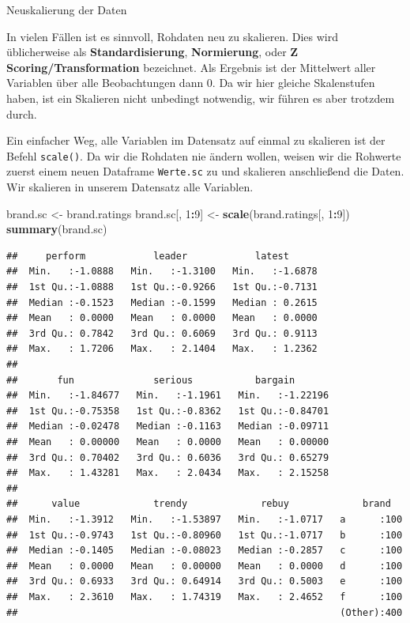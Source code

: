 \documentclass[12pt,ngerman,a4paper,ignorenonframetext,]{beamer}
\newenvironment{Shaded}{\begin{snugshade}}{\end{snugshade}}
\newcommand{\DecValTok}[1]{\textcolor[rgb]{0.00,0.00,0.81}{#1}}
\newcommand{\KeywordTok}[1]{\textcolor[rgb]{0.13,0.29,0.53}{\textbf{#1}}}
\newcommand{\NormalTok}[1]{#1}
\newcommand{\OperatorTok}[1]{\textcolor[rgb]{0.81,0.36,0.00}{\textbf{#1}}}
\newcommand{\StringTok}[1]{\textcolor[rgb]{0.31,0.60,0.02}{#1}}
\begin{document}
\begin{frame}{Neuskalierung der Daten}
\protect\hypertarget{neuskalierung-der-daten}{}

In vielen Fällen ist es sinnvoll, Rohdaten neu zu skalieren. Dies wird
üblicherweise als \textbf{Standardisierung}, \textbf{Normierung}, oder
\textbf{Z Scoring/Transformation} bezeichnet. Als Ergebnis ist der
Mittelwert aller Variablen über alle Beobachtungen dann 0. Da wir hier
gleiche Skalenstufen haben, ist ein Skalieren nicht unbedingt notwendig,
wir führen es aber trotzdem durch.

Ein einfacher Weg, alle Variablen im Datensatz auf einmal zu skalieren
ist der Befehl \texttt{scale()}. Da wir die Rohdaten nie ändern wollen,
weisen wir die Rohwerte zuerst einem neuen Dataframe \texttt{Werte.sc}
zu und skalieren anschließend die Daten. Wir skalieren in unserem
Datensatz alle Variablen.

\begin{Shaded}
\begin{Highlighting}[]
\NormalTok{brand.sc <-}\StringTok{ }\NormalTok{brand.ratings}
\NormalTok{brand.sc[, }\DecValTok{1}\OperatorTok{:}\DecValTok{9}\NormalTok{] <-}\StringTok{ }\KeywordTok{scale}\NormalTok{(brand.ratings[, }\DecValTok{1}\OperatorTok{:}\DecValTok{9}\NormalTok{])}
\KeywordTok{summary}\NormalTok{(brand.sc)}
\end{Highlighting}
\end{Shaded}

\begin{verbatim}
##     perform            leader            latest       
##  Min.   :-1.0888   Min.   :-1.3100   Min.   :-1.6878  
##  1st Qu.:-1.0888   1st Qu.:-0.9266   1st Qu.:-0.7131  
##  Median :-0.1523   Median :-0.1599   Median : 0.2615  
##  Mean   : 0.0000   Mean   : 0.0000   Mean   : 0.0000  
##  3rd Qu.: 0.7842   3rd Qu.: 0.6069   3rd Qu.: 0.9113  
##  Max.   : 1.7206   Max.   : 2.1404   Max.   : 1.2362  
##                                                       
##       fun              serious           bargain        
##  Min.   :-1.84677   Min.   :-1.1961   Min.   :-1.22196  
##  1st Qu.:-0.75358   1st Qu.:-0.8362   1st Qu.:-0.84701  
##  Median :-0.02478   Median :-0.1163   Median :-0.09711  
##  Mean   : 0.00000   Mean   : 0.0000   Mean   : 0.00000  
##  3rd Qu.: 0.70402   3rd Qu.: 0.6036   3rd Qu.: 0.65279  
##  Max.   : 1.43281   Max.   : 2.0434   Max.   : 2.15258  
##                                                         
##      value             trendy             rebuy             brand    
##  Min.   :-1.3912   Min.   :-1.53897   Min.   :-1.0717   a      :100  
##  1st Qu.:-0.9743   1st Qu.:-0.80960   1st Qu.:-1.0717   b      :100  
##  Median :-0.1405   Median :-0.08023   Median :-0.2857   c      :100  
##  Mean   : 0.0000   Mean   : 0.00000   Mean   : 0.0000   d      :100  
##  3rd Qu.: 0.6933   3rd Qu.: 0.64914   3rd Qu.: 0.5003   e      :100  
##  Max.   : 2.3610   Max.   : 1.74319   Max.   : 2.4652   f      :100  
##                                                         (Other):400
\end{verbatim}


\end{frame}
\end{document}
